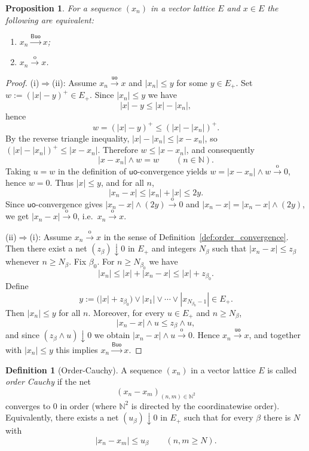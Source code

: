 \documentclass[11pt]{amsart}
\newtheorem{proposition}[theorem]{Proposition}
\theoremstyle{definition}
\newtheorem{definition}[theorem]{Definition}
\newcommand{\N}{\mathbb{N}}
\newcommand{\uo}{\ensuremath{\mathsf{uo}}}
\newcommand{\Buo}{\ensuremath{\mathsf{Buo}}}
\renewcommand{\le}{\leqslant}
\renewcommand{\ge}{\geqslant}
\begin{document}
\begin{proposition}\label{prop:Buo=order}
For a sequence $(x_n)$ in a vector lattice $E$ and $x\in E$ the following are equivalent:
\begin{enumerate}[label=(\roman*)]
\item $x_n\xrightarrow{\Buo} x$;
\item $x_n\xrightarrow{\mathrm{o}} x$.
\end{enumerate}
\end{proposition}
\begin{proof}
(i)$\Rightarrow$(ii):
Assume $x_n\xrightarrow{\uo}x$ and $|x_n|\le y$ for some $y\in E_+$.
Set $w:=(|x|-y)^+\in E_+$. Since $|x_n|\le y$ we have
\[
|x|-y \le |x|-|x_n|,
\]
hence
\[
w=(|x|-y)^+ \le (|x|-|x_n|)^+.
\]
By the reverse triangle inequality, $|x|-|x_n|\le |x-x_n|$, so $(|x|-|x_n|)^+\le |x-x_n|$.
Therefore $w\le |x-x_n|$, and consequently
\[
|x-x_n|\wedge w = w \qquad(n\in\N).
\]
Taking $u=w$ in the definition of $\uo$-convergence yields
$w=|x-x_n|\wedge w\xrightarrow{\mathrm{o}}0$, hence $w=0$.
Thus $|x|\le y$, and for all $n$,
\[
|x_n-x|\le |x_n|+|x|\le 2y.
\]
Since $\uo$-convergence gives $|x_n-x|\wedge (2y)\xrightarrow{\mathrm{o}}0$ and
$|x_n-x|=|x_n-x|\wedge (2y)$, we get $|x_n-x|\xrightarrow{\mathrm{o}}0$,
i.e.\ $x_n\xrightarrow{\mathrm{o}}x$.

(ii)$\Rightarrow$(i):
Assume $x_n\xrightarrow{\mathrm{o}}x$ in the sense of Definition~\ref{def:order_convergence}.
Then there exist a net $(z_\beta)\downarrow 0$ in $E_+$ and integers $N_\beta$ such that
$|x_n-x|\le z_\beta$ whenever $n\ge N_\beta$.
Fix $\beta_0$. For $n\ge N_{\beta_0}$ we have
\[
|x_n|\le |x|+|x_n-x|\le |x|+z_{\beta_0}.
\]
Define
\[
y:=\bigl(|x|+z_{\beta_0}\bigr)\vee |x_1|\vee\cdots\vee |x_{N_{\beta_0}-1}|\in E_+.
\]
Then $|x_n|\le y$ for all $n$.
Moreover, for every $u\in E_+$ and $n\ge N_\beta$,
\[
|x_n-x|\wedge u \le z_\beta\wedge u,
\]
and since $(z_\beta\wedge u)\downarrow 0$ we obtain $|x_n-x|\wedge u\xrightarrow{\mathrm{o}}0$.
Hence $x_n\xrightarrow{\uo}x$, and together with $|x_n|\le y$ this implies $x_n\xrightarrow{\Buo}x$.
\end{proof}

\begin{definition}[Order-Cauchy]\label{def:order_cauchy}
A sequence $(x_n)$ in a vector lattice $E$ is called \emph{order Cauchy} if the net
\[
(x_n-x_m)_{(n,m)\in\N^2}
\]
converges to $0$ in order (where $\N^2$ is directed by the coordinatewise order).
Equivalently, there exists a net $(u_\beta)\downarrow 0$ in $E_+$ such that for every $\beta$
there is $N$ with
\[
|x_n-x_m|\le u_\beta\qquad(n,m\ge N).
\]
\end{definition}
\end{document}
